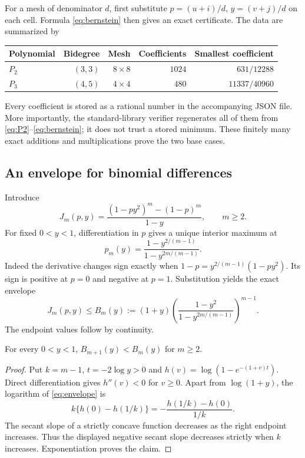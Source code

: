 For a mesh of denominator $d$, first substitute
$p=(u+i)/d$, $y=(v+j)/d$ on each cell. Formula \eqref{eq:bernstein} then gives an exact certificate. The data are summarized by
\begin{center}
\begin{tabular}{lrrrr}
\toprule
Polynomial & Bidegree & Mesh & Coefficients & Smallest coefficient\\
\midrule
$P_2$ & $(3,3)$ & $8\times8$ & $1024$ & $631/12288$\\
$P_3$ & $(4,5)$ & $4\times4$ & $480$ & $11337/40960$\\
\bottomrule
\end{tabular}
\end{center}
Every coefficient is stored as a rational number in the accompanying JSON file. More importantly, the standard-library verifier regenerates all of them from \eqref{eq:P2}--\eqref{eq:bernstein}; it does not trust a stored minimum. These finitely many exact additions and multiplications prove the two base cases.

\subsection{An envelope for binomial differences}
Introduce
\[
 J_m(p,y)=\frac{(1-py^2)^m-(1-p)^m}{1-y},\qquad m\ge2.
\]
For fixed $0<y<1$, differentiation in $p$ gives a unique interior maximum at
\begin{equation}\label{eq:pmax}
 p_m(y)=\frac{1-y^{2/(m-1)}}{1-y^{2m/(m-1)}}.
\end{equation}
Indeed the derivative changes sign exactly when
$1-p=y^{2/(m-1)}(1-py^2)$. Its sign is positive at $p=0$ and negative at $p=1$. Substitution yields the exact envelope
\begin{equation}\label{eq:envelope}
 J_m(p,y)\le B_m(y):=(1+y)
 \left(\frac{1-y^2}{1-y^{2m/(m-1)}}\right)^{m-1}.
\end{equation}
The endpoint values follow by continuity.

\begin{lemma}\label{lem:envelope}
For every $0<y<1$, $B_{m+1}(y)<B_m(y)$ for $m\ge2$.
\end{lemma}
\begin{proof}
Put $k=m-1$, $t=-2\log y>0$ and
$h(v)=\log(1-e^{-(1+v)t})$. Direct differentiation gives $h''(v)<0$ for $v\ge0$. Apart from $\log(1+y)$, the logarithm of \eqref{eq:envelope} is
\[
 k\{h(0)-h(1/k)\}=-\frac{h(1/k)-h(0)}{1/k}.
\]
The secant slope of a strictly concave function decreases as the right endpoint increases. Thus the displayed negative secant slope decreases strictly when $k$ increases. Exponentiation proves the claim.
\end{proof}

